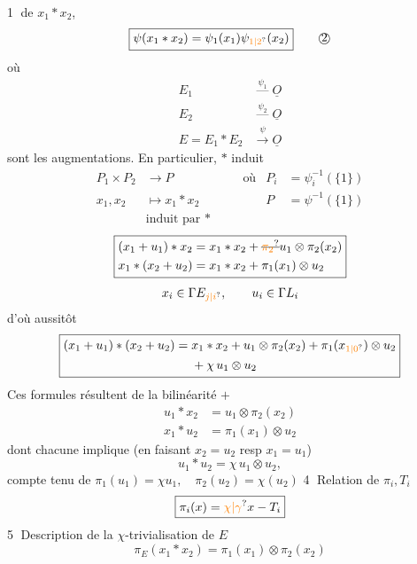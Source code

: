 \textcircled{1}  de $x_1*x_2$,
\[
\boxed{\psi(x_1*x_2)=\psi_1(x_1)\psi_{\unsure{1|2}}(x_2)}\tag*{\textcircled{2}}
\]
où
\[
\begin{aligned}
E_1&\overset{\psi_1}{\mathrel{\text{---}}}\underline O\\
E_2&\overset{\psi_2}{\mathrel{\text{---}}}\underline O\\
E=E_1*E_2&\xrightarrow{\psi}\underline O
\end{aligned}
\]
sont les augmentations. En particulier, $*$ induit
\[
\begin{aligned}
P_1\times P_2&\longrightarrow P&\quad&\text{où}&P_i&=\psi_i^{-1}(\{1\})\\
x_1,x_2&\longmapsto x_1*x_2&&&P&=\psi^{-1}(\{1\})\\[-2pt]
&\text{induit par }*
\end{aligned}
\]
\[
\boxed{\begin{aligned}
(x_1+u_1)*x_2&=x_1*x_2+\deleted{\unsure{\pi_2}}u_1\otimes\pi_2(x_2)\\
x_1*(x_2+u_2)&=x_1*x_2+\pi_1(x_1)\otimes u_2
\end{aligned}}
\]
\[
x_i\in\Gamma E_{\unsure{j|i}},\qquad u_i\in\Gamma L_i
\]
d'où aussitôt
\[
\boxed{\begin{aligned}
(x_1+u_1)*(x_2+u_2)={}&x_1*x_2+u_1\otimes\pi_2(x_2)+\pi_1(x_{\unsure{1|0}})\otimes u_2\\
&+\chi\,u_1\otimes u_2
\end{aligned}}
\]
Ces formules résultent de la bilinéarité $+$
\[
\boxed{\begin{aligned}
u_1*x_2&=u_1\otimes\pi_2(x_2)\\
x_1*u_2&=\pi_1(x_1)\otimes u_2
\end{aligned}}
\]
 dont chacune implique (en faisant $x_2=u_2$ resp $x_1=u_1$)
\[
\boxed{u_1*u_2=\chi\,u_1\otimes u_2},
\]
compte tenu de $\pi_1(u_1)=\chi u_1,\quad\pi_2(u_2)=\chi(u_2)$
\textcircled{4} Relation de $\pi_i,T_i$
\[
\boxed{\pi_i(x)=\unsure{\chi|\gamma}x-T_i}
\]
\textcircled{5} Description de la $\chi$-trivialisation de $E$
\[
\boxed{\pi_E(x_1*x_2)=\pi_1(x_1)\otimes\pi_2(x_2)}
\]

